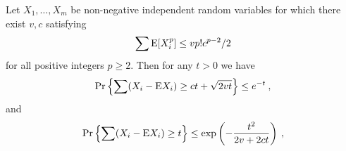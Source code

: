 \documentclass{patmorin}
\DeclareMathOperator{\exponential}{exponential}
\DeclareMathOperator{\erlang}{Erlang}
\newcommand{\abas}[1]{\textcolor{orange}{\big[Abbas: #1\big]}}
\begin{document}
\begin{thm}
\label{thm:bernstein}
Let $X_1,\dots,X_m$ be non-negative independent random variables for which there exist $v,c$ satisfying
\[\sum \mathrm{E} [X_i^p] \leq v p!  c^{p-2}/2\]
for all positive integers $p\geq2$.
Then for any $t>0$ we have
\[
\Pr \left\{ \sum (X_i - \mathrm{E} X_i) \geq ct + \sqrt{2vt}\right\}\leq e^{-t} \:,
\]
and
\[
\Pr \left\{ \sum (X_i - \mathrm{E} X_i) \geq t
\right\}\leq \exp\left(-\frac{t^2}{2v+2ct}\right) \:,
\]
\end{thm}


%
%

%
%
\end{document}
